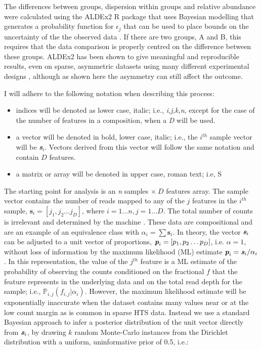 \documentclass[10pt]{article}
\begin{document}
The differences between groups, dispersion within groups and relative abundance were calculated using the ALDEx2 R package that uses Bayesian modelling that generates a probability function for  $\epsilon_j$ that can be used to place bounds on the uncertainty of the the observed data . If there are two groups, A and B,  this requires that the data comparison is properly centred on the difference between these groups. ALDEx2 has been shown to give meaningful and reproducible results, even on sparse, asymmetric datasets using many different experimental designs , although as shown here the asymmetry can still affect the outcome. 

I will adhere to the following notation when describing this process:
\begin{itemize}
\item{indices} will be denoted as lower case, italic; i.e., \textit{i,j,k,n}, except for the case of the number of features in a composition, when a \textit{D} will be used.
\item{a vector} will be denoted in bold, lower case, italic; i.e., the $i^{th}$ sample vector will be \textit{\textbf{s$_i$}}. Vectors derived from this vector will follow the same notation and contain $D$ features.
\item{a matrix or array} will be denoted in upper case, roman text; i.e, S
\end{itemize}

The starting point for analysis is an \textit{n} samples $ \times~D$ features  array. The  sample vector contains the number of reads mapped to any of the $j$  features in the $i^{th}$ sample,  $\textbf{s}_i=[j_1,j_2 \ldots j_D]$, where $i=1 \ldots n , j=1 \ldots D$. The total number of counts is irrelevant and determined by the machine . These data are compositional and are an example of an equivalence class with $\alpha_{i} = \sum \textbf{s}_{i}$. In theory, the vector $\textit{\textbf{s}}_i$ can be adjusted to a unit vector of proportions,  ${\textit{\textbf{p}}_i=[p_1,p_2 \ldots p_D] }$, i.e. $\alpha=1$, without loss of information by the maximum likelihood (ML) estimate  $\textit{\textbf{p}}_i=\textit{\textbf{s}}_i / \alpha_{i}$. In this representation, the value of the $j^{th}$ feature is a ML estimate of the probability of observing the counts conditioned on the fractional  $f$ that the feature represents in the underlying data and on the total read depth for the sample; i.e., $\mathbb{P}_{i,j}(f_{i,j}|\alpha_i)$. However, the maximum likelihood estimate will be exponentially inaccurate when the dataset contains many values near or at the low count margin  as is common in sparse HTS data. Instead we use a standard Bayesian approach  to infer a posterior distribution of the unit vector directly from $\textit{\textbf{s}}_i$, by drawing $k$ random Monte-Carlo instances from the Dirichlet distribution with a uniform, uninformative prior of 0.5, i.e.:
\end{document}
